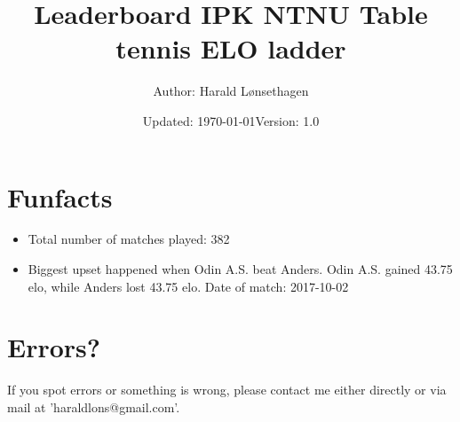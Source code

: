\documentclass[11pt]{article}
\newcommand\tab[1][1cm]{\hspace*{#1}}
\begin{document}
\title{\textbf{Leaderboard IPK NTNU Table tennis ELO ladder }}
\author{Author: Harald Lønsethagen}
\date{Updated: \today\tab Version: 1.0}

\maketitle
 

\makeatletter


\section*{Funfacts}
\begin{itemize}
    \item Total number of matches played: 382
    \item Biggest upset happened when Odin A.S. beat Anders. Odin A.S. gained 43.75 elo, while Anders lost 43.75 elo. Date of match: 2017-10-02
\end{itemize}
\section*{Errors?}
If you spot errors or something is wrong, please contact me either directly or via mail at 'haraldlons@gmail.com'.
\end{document}
